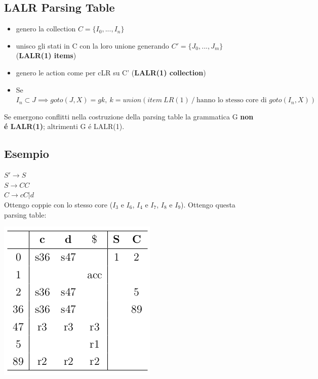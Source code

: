 \subsection{LALR Parsing Table}

\begin{itemize}
    \item genero la collection $C = \{ I_0, ...,I_n\}$\\
    \item unisco gli stati in C con la loro unione generando $C' = \{ J_0, ..., J_m \}$ (\textbf{LALR(1) items})\\
    \item genero le action come per cLR su C' (\textbf{LALR(1) collection})\\
    \item Se $I_n \subset J \implies goto(J, X) = gk,\ k = union(item\ LR(1) \ / \ \text{hanno lo stesso core di } goto(I_n, X))$\\
\end{itemize}

\begin{tcolorbox}\begin{center}
    Se emergono conflitti nella costruzione della parsing table la grammatica G \textbf{non \'e LALR(1)}; altrimenti G \'e LALR(1).
\end{center}\end{tcolorbox}

\subsection{Esempio}
$S' \rightarrow S$\\
$S \rightarrow CC$\\
$C \rightarrow cC|d$\\
Ottengo coppie con lo stesso core ($I_3$ e $I_6$, $I_4$ e $I_7$, $I_8$ e $I_9$). Ottengo questa parsing table:

\begin{center}
    \includegraphics[scale=0.6]{Chapters/Img/c04_15.png}\\
\end{center}

